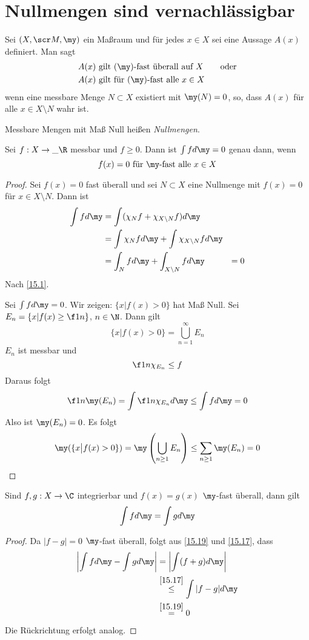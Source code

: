 \documentclass{mycourse}
\begin{document}
\section{Nullmengen sind vernachlässigbar}

\begin{df*}
	Sei $(X, \scr M, \my)$ ein Maßraum und für jedes $x\in X$ sei eine Aussage $A(x)$ definiert.
	Man sagt
	\begin{align*}
		&A(x) \text{ gilt ($\my$)-fast überall auf $X$} \qquad \text{oder}\\
		&A(x) \text{ gilt für ($\my$)-fast alle $x\in X$}
	\end{align*}
	wenn eine messbare Menge $N\subset X$ existiert mit $\my(N) = 0$, so, dass $A(x)$ für alle $x\in X\setminus N$ wahr ist.

	Messbare Mengen mit Maß Null heißen \emph{Nullmengen}.
\end{df*}

\begin{thm}
	\label{15.19}
	Sei $f:X\to \_\R$ messbar und $f\ge 0$.
	Dann ist $\int fd\my = 0$ genau dann, wenn
	\[
		f(x) = 0 \text{ für $\my$-fast alle $x\in X$}
	\]
	\begin{proof}
		Sei $f(x)=0$ fast überall und sei $N\subset X$ eine Nullmenge mit $f(x)=0$ für $x\in X\setminus N$.
		Dann ist
		\begin{align*}
			\int fd\my &= \int (\chi_N f + \chi_{X\setminus N}f)d\my\\
								   &= \int \chi_N fd\my + \int \chi_{X\setminus N}fd\my\\
							 &=\int_N fd\my + \int_{X\setminus N}fd\my
			&=0
		\end{align*}
		Nach \ref{15.1}.

		Sei $\int fd\my = 0$.
		Wir zeigen: $\{x\big| f(x) > 0\}$ hat Maß Null.
		Sei $E_n = \{x| f(x) \ge \f 1n\}$, $n\in \N$.
		Dann gilt
		\[
			\{x\big| f(x) > 0\} = \bigcup_{n=1}^\infty E_n
		\]
		$E_n$ ist messbar und
		\[
			\f 1n \chi_{E_n} \le f
		\]
		Daraus folgt
		\[
			\f 1n \my(E_n) = \int \f 1n \chi_{E_n}d\my \le \int f d\my = 0
		\]
		Also ist $\my(E_n) = 0$.		
		Es folgt
		\[
			\my(\{x\big |f(x)>0\}) = \my\left( \bigcup_{n\ge 1}E_n\right) \le \sum_{n\ge 1} \my(E_n) = 0
		\]
	\end{proof}
\end{thm}


\begin{kor}
	\label{15.20}
	Sind $f,g:X\to \C$ integrierbar und $f(x)=g(x)$ $\my$-fast überall, dann gilt
	\[
		\int fd\my = \int gd\my
	\]
	\begin{proof}
		Da $|f-g|=0$ $\my$-fast überall, folgt aus \ref{15.19} und \ref{15.17}, dass
		\begin{align*}
			\left|\int fd\my - \int gd\my \right| &= \left| \int(f+g) d\my\right|\\
																																	  &\stackrel{\ref{15.17}}\le \int |f-g| d\my \\
																										   &\stackrel{\ref{15.19}}= 0
		\end{align*}
		Die Rückrichtung erfolgt analog.
	\end{proof}
\end{kor}
\end{document}
